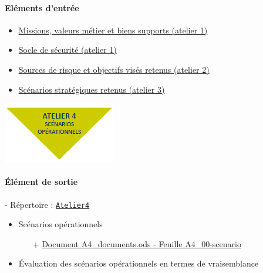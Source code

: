 \documentclass[french, 12pt]{article}%
\newcommand{\itemE}{\item[$\bullet$]}
\begin{document}
\begin{minipage}[c]{0.6\linewidth}
\paragraph{Eléments d'entrée}
\begin{itemize}
\itemE \href{run:./ressource_eleve/Atelier1/A1_documents.ods}{Missions, valeurs métier et biens supports (atelier 1)}
\itemE \href{run:./ressource_eleve/Atelier1/A1_documents.ods}{Socle de sécurité (atelier 1) }
\itemE \href{run:./ressource_eleve/Atelier2/A3_documents.ods}{Sources de risque et objectifs visés retenus (atelier 2)}
\itemE \href{run:./ressource_eleve/Atelier3/A3_documents.ods}{Scénarios stratégiques retenus (atelier 3)}
\end{itemize}

\end{minipage}
\begin{minipage}[c]{0.4\linewidth}
\begin{center}
\includegraphics[scale=0.8]{./ressource/logoA4.png}
\end{center}
\end{minipage}





\paragraph{Élément de sortie} - Répertoire : \href{run:./ressource_eleve/Atelier4/}{\verb?Atelier4?}
\begin{itemize}
    \itemE Scénarios opérationnels
    	\begin{itemize}
		\item[+] \href{run:./ressource_eleve/Atelier4/A4_documents.ods}{Document A4\_documents.ods - Feuille A4\_00-scenario}
		\end{itemize}
	\itemE Évaluation des scénarios opérationnels en termes de vraisemblance
\end{itemize}
\end{document}
